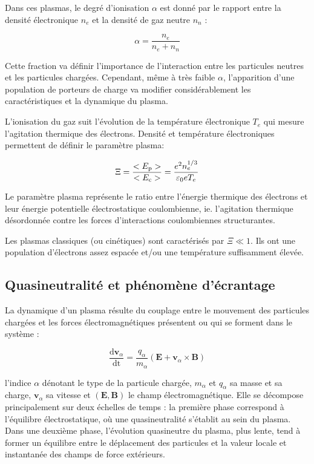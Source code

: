 \begin{refsection}
Dans ces plasmas, le degré d'ionisation $\alpha$ est donné par le rapport
entre la densité électronique $n_{e}$ et la densité de gaz neutre
$n_{n}$ :

\begin{equation}
\alpha=\frac{n_{e}}{n_{e}+n_{n}}
\end{equation}

Cette fraction va définir l'importance de l'interaction entre les particules
neutres et les particules chargées. Cependant, même à très faible $\alpha$,
l'apparition d'une population de porteurs de charge va modifier considérablement 
les caractéristiques et la dynamique du plasma.

L'ionisation du gaz suit l'évolution de la température électronique $T_{e}$
qui mesure l'agitation thermique des électrons. Densité et température
électroniques permettent de définir le paramètre plasma:

\begin{equation}
\label{1-paramPlasma}
\Xi=\frac{<E_\text{p}>}{<E_\text{c}>}=\frac{e^{{2}}
n_{e}^{{1/3}}}{\varepsilon{_{0}} eT_{e}}
\end{equation}

Le paramètre plasma représente le ratio entre l'énergie thermique des
électrons et leur énergie potentielle électrostatique coulombienne, ie.
l'agitation thermique désordonnée contre les forces d'interactions
coulombiennes structurantes.

Les plasmas classiques (ou cinétiques) sont caractérisés par
$\Xi\ll 1$. Ils ont une population d'électrons assez espacée et/ou une
température suffisamment élevée.

\subsection{Quasineutralité et phénomène d'écrantage}
La dynamique d'un plasma résulte du couplage entre le mouvement des
particules chargées et les forces électromagnétiques présentent ou qui se
forment dans le système :

\begin{equation}
\frac{\text{d} \mathbf
v_\alpha}{\text{dt}}=\frac{q_\alpha}{m_\alpha}(\mathbf E+ \mathbf
v_\alpha\times\mathbf B)
\end{equation}

l'indice $\alpha$ dénotant le type de la particule chargée, $m_\alpha$
et $q_\alpha$ sa masse et sa charge, $\mathbf v_\alpha$ sa vitesse et $(\mathbf
E,\mathbf B)$ le champ électromagnétique.
Elle se décompose principalement sur deux échelles de temps :
la première phase correspond à l'équilibre électrostatique, où une
quasineutralité s'établit au sein du plasma. Dans une deuxième phase, l'évolution quasineutre du
plasma, plus lente, tend à former un équilibre entre le déplacement des particules et la valeur locale
et instantanée des champs de force extérieurs.


\end{refsection}
